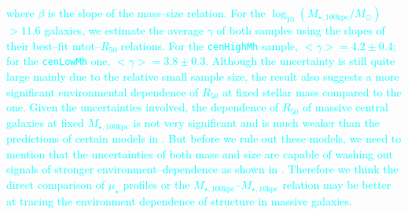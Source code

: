\documentclass[a4paper,fleqn,usenatbib]{mnras}
\def\rbcg{\texttt{cenHighMh}}
\def\nbcg{\texttt{cenLowMh}}
\def\minn{{$M_{\star,10\mathrm{kpc}}$}}
\def\mtot{{$M_{\star,100\mathrm{kpc}}$}}
\def\logmtot{{$\log_{10} (M_{\star,100\mathrm{kpc}}/M_{\odot})$}}
\def\mden{{$\mu_{\star}$}}
\newcommand{\song}[1]{\textcolor{cyan}{#1}}
\begin{document}
    \song{
    where $\beta$ is the slope of the mass--size relation.
    For the \logmtot{}$>11.6$ galaxies, we estimate the average $\gamma$ of both
    samples using the slopes of their best--fit mtot{}--$R_{\mathrm{50}}$ relations.
    For the \rbcg{} sample, $<\gamma> = 4.2\pm0.4$; for the \nbcg{} one, 
    $<\gamma> = 3.8\pm0.3$. 
    Although the uncertainty is still quite large mainly due to the relative small 
    sample size, the result also suggests a more significant environmental dependence
    of $R_{\mathrm{50}}$ at fixed stellar mass compared to the \citet{HCompany13} 
    one.
    Given the uncertainties involved, the dependence of $R_{\mathrm{50}}$ of 
    massive central galaxies at fixed \mtot{} is not very significant and is much 
    weaker than the predictions of certain models in \citet{Shankar2014}. 
    But before we rule out these models, we need to mention that the uncertainties 
    of both mass and size are capable of washing out signals of stronger 
    environment--dependence as shown in \citet{HCompany13}.
    Therefore we think the direct comparison of \mden{} profiles or the 
    \mtot{}--\minn{} relation may be better at tracing the environment dependence
    of structure in massive galaxies. 
    }
    
\end{document}
